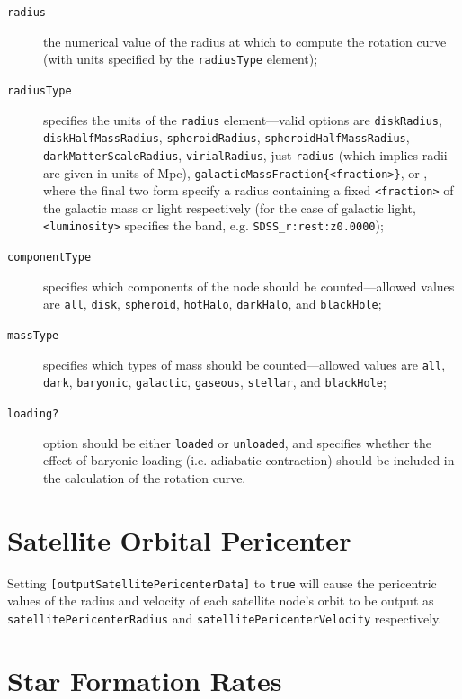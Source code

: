 \begin{description}
 \item [{\tt radius}] the numerical value of the radius at which to compute the rotation curve (with units specified by the {\tt radiusType} element);
 \item [{\tt radiusType}] specifies the units of the {\tt radius} element---valid options are {\tt diskRadius}, {\tt diskHalfMassRadius}, {\tt spheroidRadius}, {\tt spheroidHalfMassRadius}, {\tt darkMatterScaleRadius}, {\tt virialRadius}, just {\tt radius} (which implies radii are given in units of Mpc), {\tt galacticMassFraction\{\textless fraction\textgreater\}}, or , where the final two form specify a radius containing a fixed {\tt \textless fraction\textgreater} of the galactic mass or light respectively (for the case of galactic light, {\tt \textless luminosity\textgreater} specifies the band, e.g. {\tt SDSS\_r:rest:z0.0000});
 \item [{\tt componentType}] specifies which components of the node should be counted---allowed values are {\tt all}, {\tt disk}, {\tt spheroid}, {\tt hotHalo}, {\tt darkHalo}, and {\tt blackHole};
 \item [{\tt massType}] specifies which types of mass should be counted---allowed values are {\tt all}, {\tt dark}, {\tt baryonic}, {\tt galactic}, {\tt gaseous}, {\tt stellar}, and {\tt blackHole};
 \item [{\tt loading?}] option should be either {\tt loaded} or {\tt unloaded}, and specifies whether the effect of baryonic loading (i.e. adiabatic contraction) should be included in the calculation of the rotation curve.
\end{description}

\section{Satellite Orbital Pericenter}

Setting {\tt [outputSatellitePericenterData]} to {\tt true} will cause the pericentric values of the radius and velocity of each satellite node's orbit to be output as {\tt satellitePericenterRadius} and {\tt satellitePericenterVelocity} respectively.

\section{Star Formation Rates}

